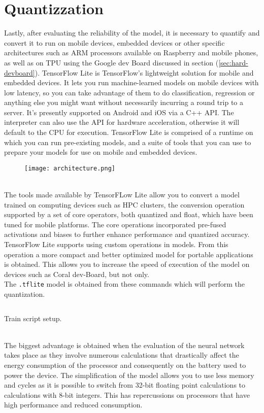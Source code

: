 \section{Quantizzation}
Lastly, after evaluating the reliability of the model, it is necessary to
quantify and convert it to run on mobile devices, embedded devices or other
specific architectures such as ARM processors available on Raspberry and mobile
phones, as well as on TPU using the Google dev Board discussed in section
(\ref{sec:hard-devboard}).
TensorFlow Lite is TensorFlow’s lightweight solution for mobile and embedded
devices. It lets you run machine-learned models on mobile devices with low
latency, so you can take advantage of them to do classification, regression or
anything else you might want without necessarily incurring a round trip to a
server. It’s presently supported on Android and iOS via a C++ API.
The interpreter can also use the API for hardware
acceleration, otherwise it will default to the CPU for execution.
TensorFlow Lite is comprised of a runtime on which you can run pre-existing
models, and a suite of tools that you can use to prepare your models for use on
mobile and embedded devices.
%
%
\begin{figure}[htb]
	\centering
	\texttt{[image: architecture.png]}
	\label{fig:tflite-architecture}
\end{figure}
%
%
\\The tools made available by TensorFLow Lite allow you to convert a model trained
on computing devices such as HPC clusters, the conversion operation supported by
a set of core operators, both quantized and float, which have been tuned for
mobile platforms. The core operations incorporated pre-fused activations and
biases to further enhance performance and quantized accuracy. 
TensorFlow Lite supports using custom operations in models. 
From this operation a more compact and better optimized model for portable
applications is obtained. This allows you to increase the speed of execution of
the model on devices such as Coral dev-Board, but not only.\\
The \texttt{.tflite} model is obtained from these commands which will perform
the quantization.
%
\begin{listing}[ht] 
\inputminted[frame=lines,framesep=2mm, linenos=true, autogobble, breaklines=true, fontsize=\scriptsize, firstline=16, lastline=46]{shell}{neuralnetworks/code/tflite_ssd_mobilenet_v2_coco_2018_03_29.sh} 
\caption{Train script setup.} 
\label{lst:tflite-code-shell} 
\end{listing}
%
\\The biggest advantage is obtained when the evaluation of the neural network
takes place as they involve numerous calculations that drastically affect the
energy consumption of the processor and consequently on the battery used to
power the device. 
The simplification of the model allows you to use less memory and cycles as it
is possible to switch from 32-bit floating point calculations to calculations
with 8-bit integers. 
This has repercussions on processors that have high performance and reduced
consumption.